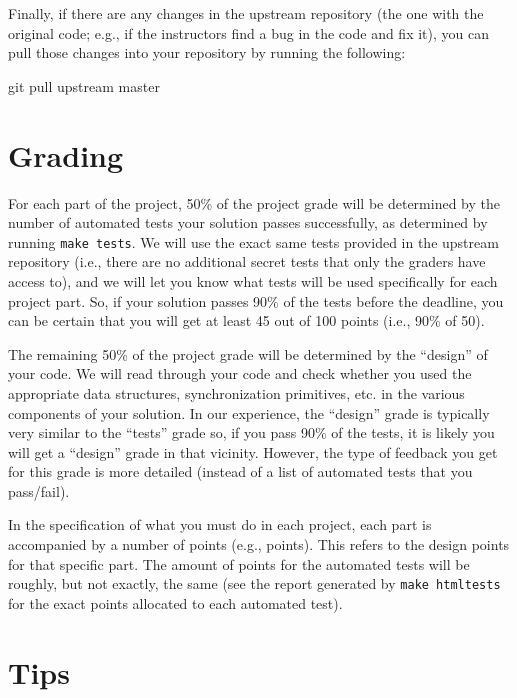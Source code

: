 \documentclass[10pt]{article}
\newcommand{\points}[1]{{\sffamily\mdseries\guillemotleft #1 points\guillemotright{}}}
\newenvironment{example}%
{\VerbatimEnvironment\begin{Sbox}\begin{VerbExample}}%
{\end{VerbExample}\end{Sbox}\setlength{\fboxsep}{8pt}\begin{center}\fcolorbox{black}{backgroundgray}{\TheSbox}\end{center}}
\begin{document}
Finally, if there are any changes in the upstream repository (the one with the original code; e.g., if the instructors find a bug in the code and fix it), you can pull those changes into your repository by running the following:

\begin{example}
git pull upstream master
\end{example}

\pagebreak

\section{Grading}
\label{sec:grading}

For each part of the project, 50\% of the project grade will be determined by the number of automated tests your solution passes successfully, as determined by running \texttt{make tests}. We will use the exact same tests provided in the upstream repository (i.e., there are no additional secret tests that only the graders have access to), and we will let you know what tests will be used specifically for each project part. So, if your solution passes 90\% of the tests before the deadline, you can be certain that you will get at least 45 out of 100 points (i.e., 90\% of 50).

The remaining 50\% of the project grade will be determined by the ``design'' of your code. We will read through your code and check whether you used the appropriate data structures, synchronization primitives, etc. in the various components of your solution. In our experience, the ``design'' grade is typically very similar to the ``tests'' grade so, if you pass 90\% of the tests, it is likely you will get a ``design'' grade in that vicinity. However, the type of feedback you get for this grade is more detailed (instead of a list of automated tests that you pass/fail).

In the specification of what you must do in each project, each part is accompanied by a number of points (e.g., \points{10}). This refers to the design points for that specific part. The amount of points for the automated tests will be roughly, but not exactly, the same (see the report generated by \texttt{make htmltests} for the exact points allocated to each automated test).

\section{Tips}
\label{sec:tips}
\end{document}
